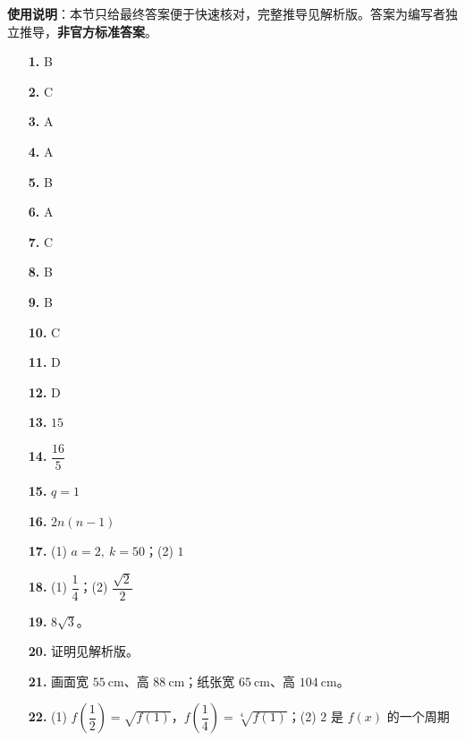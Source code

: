 
\begin{gknotice}
\textbf{使用说明}：本节只给最终答案便于快速核对，完整推导见解析版。答案为编写者独立推导，\textbf{非官方标准答案}。
\end{gknotice}

\begin{itemize}[leftmargin=2.6em]
  \item[\textbf{1.}] B
  \item[\textbf{2.}] C
  \item[\textbf{3.}] A
  \item[\textbf{4.}] A
  \item[\textbf{5.}] B
  \item[\textbf{6.}] A
  \item[\textbf{7.}] C
  \item[\textbf{8.}] B
  \item[\textbf{9.}] B
  \item[\textbf{10.}] C
  \item[\textbf{11.}] D
  \item[\textbf{12.}] D
  \item[\textbf{13.}] $15$
  \item[\textbf{14.}] $\dfrac{16}{5}$
  \item[\textbf{15.}] $q=1$
  \item[\textbf{16.}] $2n(n-1)$
  \item[\textbf{17.}] (1) $a=2,\ k=50$；(2) $1$
  \item[\textbf{18.}] (1) $\dfrac14$；(2) $\dfrac{\sqrt2}{2}$
  \item[\textbf{19.}] $8\sqrt3$。
  \item[\textbf{20.}] 证明见解析版。
  \item[\textbf{21.}] 画面宽 $55\ \mathrm{cm}$、高 $88\ \mathrm{cm}$；纸张宽 $65\ \mathrm{cm}$、高 $104\ \mathrm{cm}$。
  \item[\textbf{22.}] (1) $f\left(\dfrac12\right)=\sqrt{f(1)}$，$f\left(\dfrac14\right)=\sqrt[4]{f(1)}$；(2) $2$ 是 $f(x)$ 的一个周期
\end{itemize}
